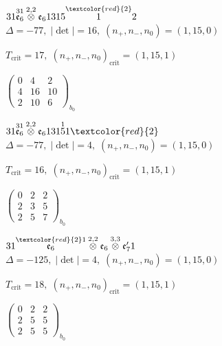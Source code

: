 \documentclass[10pt]{article}
\begin{document}
\smallskip

$31\overset{31}{\mathfrak{e}_6}\overset{2,2}{\otimes}\mathfrak{e}_61315\overset{\textcolor{red}{2}}{1}2$ \quad $\Delta=-77,\; |\det|=16,\; (n_+,n_-,n_0)=(1,15,0)$

\hspace{1em}$T_{\text{crit}}=17,\; (n_+,n_-,n_0)_{\text{crit}}=(1,15,1)$

\hspace{2em}$\left(\begin{smallmatrix}0 & 4 & 2 \\ 4 & 16 & 10 \\ 2 & 10 & 6\end{smallmatrix}\right)_{\!b_0}$

\smallskip

$31\overset{31}{\mathfrak{e}_6}\overset{2,2}{\otimes}\mathfrak{e}_6131\overset{1}{5}1\textcolor{red}{2}$ \quad $\Delta=-77,\; |\det|=4,\; (n_+,n_-,n_0)=(1,15,0)$

\hspace{1em}$T_{\text{crit}}=16,\; (n_+,n_-,n_0)_{\text{crit}}=(1,15,1)$

\hspace{2em}$\left(\begin{smallmatrix}0 & 2 & 2 \\ 2 & 3 & 5 \\ 2 & 5 & 7\end{smallmatrix}\right)_{\!b_0}$

\smallskip

$31\overset{\textcolor{red}{2}1}{\mathfrak{e}_6}\overset{2,2}{\otimes}\mathfrak{e}_6\overset{3,3}{\otimes}\mathfrak{e}_7'1$ \quad $\Delta=-125,\; |\det|=4,\; (n_+,n_-,n_0)=(1,15,0)$

\hspace{1em}$T_{\text{crit}}=18,\; (n_+,n_-,n_0)_{\text{crit}}=(1,15,1)$

\hspace{2em}$\left(\begin{smallmatrix}0 & 2 & 2 \\ 2 & 5 & 5 \\ 2 & 5 & 5\end{smallmatrix}\right)_{\!b_0}$
\end{document}
